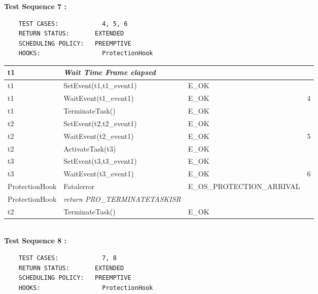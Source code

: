 \documentclass[10pt]{article}
\newlength{\Li}\settowidth{\Li}{Running}
\newlength{\Lii}\setlength{\Lii}{7cm}
\newlength{\Liiii}\setlength{\Liiii}{0.9cm}
\newlength{\Liii}\setlength{\Liii}{\textwidth} \addtolength{\Liii}{-\Li} \addtolength{\Liii}{-\Lii} \addtolength{\Liii}{-\Liiii}
\begin{document}
	\textbf{Test Sequence 7 :}
	\begin{lstlisting}
	TEST CASES:		       4, 5, 6
	RETURN STATUS:	  	 EXTENDED
	SCHEDULING POLICY:   PREEMPTIVE
	HOOKS:		           ProtectionHook
	\end{lstlisting}
	

	\begin{supertabular}{|p{\Li}|p{\Lii}|p{\Liii}|p{\Liiii}|} \hline 
	t1	& \textit{Wait Time Frame elapsed}						& 										& \\ \hline
	t1	& SetEvent(t1,t1\_event1)								& E\_OK									& \\ \hline
	t1	& WaitEvent(t1\_event1)								& E\_OK									& 4 \\ \hline
	t1	& TerminateTask()									& E\_OK									& \\ \hline	
	t2	& SetEvent(t2,t2\_event1)								& E\_OK									& \\ \hline
	t2	& WaitEvent(t2\_event1)								& E\_OK									& 5 \\ \hline
	t2	& ActivateTask(t3)									& E\_OK									& \\ \hline
	t3	& SetEvent(t3,t3\_event1)								& E\_OK									& \\ \hline
	t3	& WaitEvent(t3\_event1)								& E\_OK									& 6 \\ \hline
	ProtectionHook		& Fatalerror					& E\_OS\_PROTECTION\_ARRIVAL						& \\ \hline
	ProtectionHook		& \textit{return PRO\_TERMINATETASKISR}	& 										& \\ \hline
	t2	& TerminateTask()									& E\_OK									& \\ \hline
	\end{supertabular}\\	
	
	\textbf{Test Sequence 8 :}
	\begin{lstlisting}
	TEST CASES:		       7, 8
	RETURN STATUS:	  	 EXTENDED
	SCHEDULING POLICY:   PREEMPTIVE
	HOOKS:		           ProtectionHook
	\end{lstlisting}
	
\end{document}
